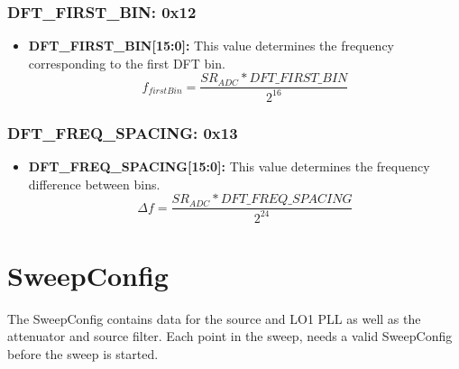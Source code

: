 \documentclass{article}
\newcommand{\bitrect}[2]{
  \begin{pgfonlayer}{foreground}
    \draw [thick] (0,0) rectangle (#1,1);
    \pgfmathsetmacro\result{#1-1}
    \foreach \x in {1,...,\result}
      \draw [thick] (\x,1) -- (\x, 0.8);
  \end{pgfonlayer}
  \bitlabels{#1}{#2}
}
\newcommand{\rwbits}[3]{
  \draw [thick] (#1,0) rectangle ++(#2,1) node[pos=0.5]{#3};
  \pgfmathsetmacro\start{#1+0.5}
  \pgfmathsetmacro\finish{#1+#2-0.5}
}
\newcommand{\bitlabels}[2]{
  \foreach \bit in {1,...,#1}{
     \pgfmathsetmacro\result{#2}
     \node [above] at (\bit-0.5, 1) {\pgfmathprintnumber{\result}};
   }
}
\begin{document}
\subsubsection{DFT\_FIRST\_BIN: 0x12}
\begin{center}
\end{center}
\begin{itemize}
\item \textbf{DFT\_FIRST\_BIN[15:0]:} This value determines the frequency corresponding to the first DFT bin.
$$ f_{firstBin} =  \frac{SR_{ADC} * DFT\_FIRST\_BIN}{2^{16}}$$
\end{itemize}

\subsubsection{DFT\_FREQ\_SPACING: 0x13}
\begin{center}
\end{center}
\begin{itemize}
\item \textbf{DFT\_FREQ\_SPACING[15:0]:} This value determines the frequency difference between bins.
$$ \Delta f =  \frac{SR_{ADC} * DFT\_FREQ\_SPACING}{2^{24}}$$
\end{itemize}

\section{SweepConfig}
\label{sweepconfig}
The SweepConfig contains data for the source and LO1 PLL as well as the attenuator and source filter. Each point in the sweep, needs a valid SweepConfig before the sweep is started.
\end{document}
